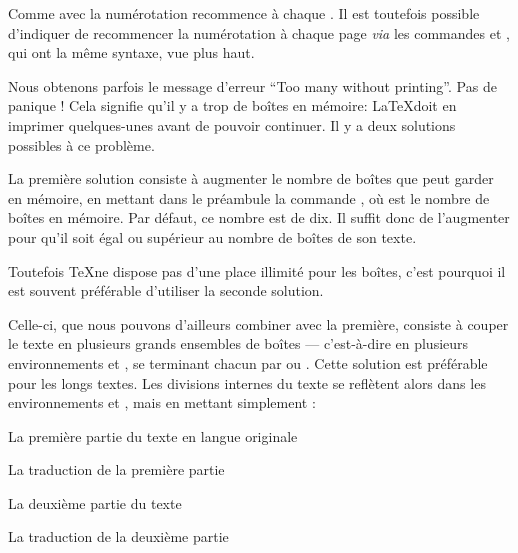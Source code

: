 \begin{attention}
Comme avec  la numérotation recommence à chaque . Il est toutefois possible d'indiquer de recommencer la numérotation  à chaque page \emph{via} les commandes  et , qui ont la même syntaxe, vue plus haut. 
\end{attention}

Nous obtenons parfois le message d'erreur \enquote{Too many  without printing}. Pas de panique ! Cela signifie qu'il y a trop de boîtes en mémoire: \LaTeX  doit en imprimer quelques-unes avant de pouvoir continuer.  Il y a deux solutions possibles à ce problème.

La première solution consiste à  augmenter le nombre de boîtes que  peut garder en mémoire, en mettant dans le préambule la commande , où  est le nombre de boîtes en mémoire. Par défaut, ce nombre est de dix. Il suffit donc de l'augmenter  pour qu'il soit égal ou supérieur au nombre de boîtes de son  texte. 

Toutefois \TeX ne dispose pas d'une place illimité pour les boîtes, c'est pourquoi il est souvent préférable d'utiliser la seconde solution.


Celle-ci, que nous pouvons d'ailleurs combiner avec la première, consiste à  couper le texte en plusieurs grands ensembles de boîtes --- c'est-à-dire en plusieurs environnements  et , se terminant chacun par  ou .  Cette solution est préférable pour les longs textes. Les divisions internes du texte se reflètent alors dans les environnements  et ,  mais en mettant simplement :

\begin{latexcode}
\begin{pages}  
\begin{Leftside}  \beginnumbering 
La première partie du texte en langue originale
\endnumbering  \end{Leftside} 
 
\begin{Rightside} \beginnumbering
La traduction de la première partie
\endnumbering \end{Rightside} 
 \Pages
 
\begin{Leftside} \beginnumbering  
La deuxième partie du texte 
\endnumbering  \end{Leftside} 
 
\begin{Rightside}  \beginnumbering
La traduction de la deuxième partie
\endnumbering \end{Rightside} 
 \Pages

  \end{pages}
\end{latexcode}

